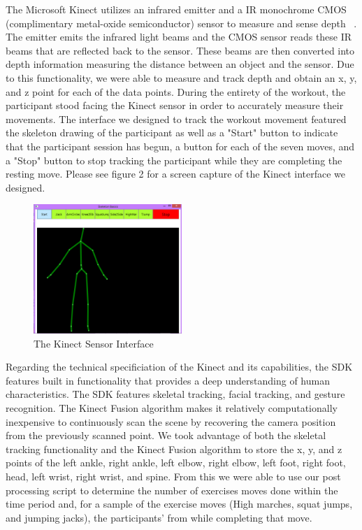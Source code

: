 The Microsoft Kinect utilizes an infrared emitter and a IR monochrome CMOS (complimentary metal-oxide semiconductor) sensor to measure and sense depth ~\cite{MicrosoftCorporation1:2013:Online, MicrosoftCorporation2:2013:Online}.  The emitter emits the infrared light beams and the CMOS sensor reads these IR beams that are reflected back to the sensor.  These beams are then converted into depth information measuring the distance between an object and the sensor.  Due to this functionality, we were able to measure and track depth and obtain an x, y, and z point for each of the data points.   During the entirety of the workout, the participant stood facing the Kinect sensor in order to accurately measure their movements.  The interface we designed to track the workout movement featured the skeleton drawing of the participant as well as a "Start" button to indicate that the participant session has begun, a button for each of the seven moves, and a "Stop" button to stop tracking the participant while they are completing the resting move.  Please see figure 2 for a screen capture of the Kinect interface we designed.  \\
\begin{figure} [h]
	\includegraphics[width=0.5\textwidth]{images/figure2}
\caption{The Kinect Sensor Interface}
\end{figure}
Regarding the technical specificiation of the Kinect and its capabilities, the SDK features built in functionality that provides a deep understanding of human characteristics.  The SDK features skeletal tracking, facial tracking, and gesture recognition.  The Kinect Fusion algorithm makes it relatively computationally inexpensive to continuously scan the scene by recovering the camera position from the previously scanned point.  We took advantage of both the skeletal tracking functionality and the Kinect Fusion algorithm to store the x, y, and z points of the left ankle, right ankle, left elbow, right elbow, left foot, right foot, head, left wrist, right wrist, and spine.  From this we were able to use our post processing script to determine the number of exercises moves done within the time period and, for a sample of the exercise moves (High marches, squat jumps, and jumping jacks), the participants' from while completing that move.
